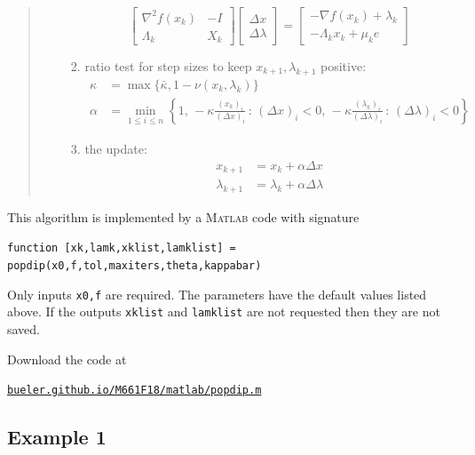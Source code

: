 \documentclass[11pt]{article}
\newcommand{\grad}{\nabla}
\newcommand{\Matlab}{\textsc{Matlab}\xspace}
\begin{document}
\begin{quote}
\begin{itemize}
\begin{enumerate}
    $$\begin{bmatrix}
\grad^2 f(x_k) & - I \\
\Lambda_k & X_k
\end{bmatrix}
\begin{bmatrix}
\Delta x \\
\Delta \lambda
\end{bmatrix}
=
\begin{bmatrix}
-\grad f(x_k) + \lambda_k \\
-\Lambda_k x_k + \mu_k e
\end{bmatrix}$$
    \item ratio test for step sizes to keep $x_{k+1},\lambda_{k+1}$ positive:
\begin{align*}
\kappa &= \max\{\bar\kappa,1-\nu(x_k,\lambda_k)\} \\
\alpha &= \min_{1\le i\le n} \left\{1, \,-\kappa \frac{(x_k)_i}{(\Delta x)_i} \,:\, (\Delta x)_i < 0, \,-\kappa \frac{(\lambda_k)_i}{(\Delta \lambda)_i} \,:\, (\Delta \lambda)_i < 0\right\}
\end{align*}
    \item the update:
\begin{align*}
x_{k+1} &= x_k + \alpha \Delta x \\
\lambda_{k+1} &= \lambda_k + \alpha \Delta \lambda
\end{align*}
    \end{enumerate}
\end{itemize}
\end{quote}

This algorithm is implemented by a \Matlab code with signature

\medskip
\noindent \mbox{\texttt{function [xk,lamk,xklist,lamklist] = popdip(x0,f,tol,maxiters,theta,kappabar)}}

\medskip
\noindent Only inputs \texttt{x0,f} are required.  The parameters have the default values listed above.  If the outputs \texttt{xklist} and \texttt{lamklist} are not requested then they are not saved.

Download the code at
\begin{center}
    \href{http://bueler.github.io/M661F18/matlab/popdip.m}{\texttt{bueler.github.io/M661F18/matlab/popdip.m}}
\end{center}


\subsection*{Example 1}
\end{document}
